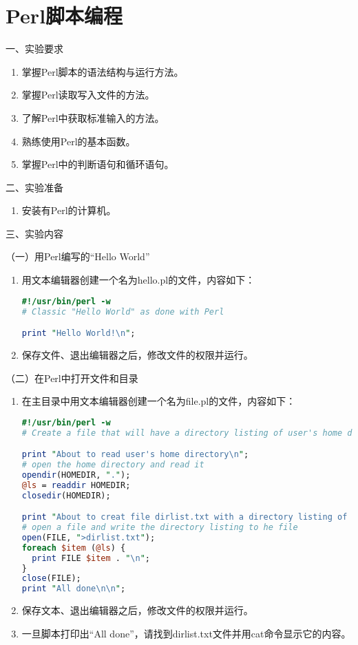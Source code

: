 \chapter{Perl脚本编程}

\noindent
一、实验要求
\begin{enumerate}
  \item 掌握Perl脚本的语法结构与运行方法。
  \item 掌握Perl读取写入文件的方法。
  \item 了解Perl中获取标准输入的方法。
  \item 熟练使用Perl的基本函数。
  \item 掌握Perl中的判断语句和循环语句。
\end{enumerate}

\vspace{0.2in}
\noindent
二、实验准备
\begin{enumerate}
  \item 安装有Perl的计算机。
\end{enumerate}

\vspace{0.2in}
\noindent
三、实验内容

\vspace{0.1in}
（一）用Perl编写的``Hello World''
\begin{enumerate}
  \item 用文本编辑器创建一个名为hello.pl的文件，内容如下：
\begin{lstlisting}[language=perl]
#!/usr/bin/perl -w
# Classic "Hello World" as done with Perl

print "Hello World!\n";
\end{lstlisting}
  \item 保存文件、退出编辑器之后，修改文件的权限并运行。
\end{enumerate}

\vspace{0.1in}
（二）在Perl中打开文件和目录
\begin{enumerate}
  \item 在主目录中用文本编辑器创建一个名为file.pl的文件，内容如下：
\begin{lstlisting}[language=perl]
#!/usr/bin/perl -w
# Create a file that will have a directory listing of user's home dir

print "About to read user's home directory\n";
# open the home directory and read it
opendir(HOMEDIR, ".");
@ls = readdir HOMEDIR;
closedir(HOMEDIR);

print "About to creat file dirlist.txt with a directory listing of user's home dir\n";
# open a file and write the directory listing to he file
open(FILE, ">dirlist.txt");
foreach $item (@ls) {
  print FILE $item . "\n";
}
close(FILE);
print "All done\n\n";
\end{lstlisting}
  \item 保存文本、退出编辑器之后，修改文件的权限并运行。
  \item 一旦脚本打印出“All done”，请找到dirlist.txt文件并用cat命令显示它的内容。
\end{enumerate}

